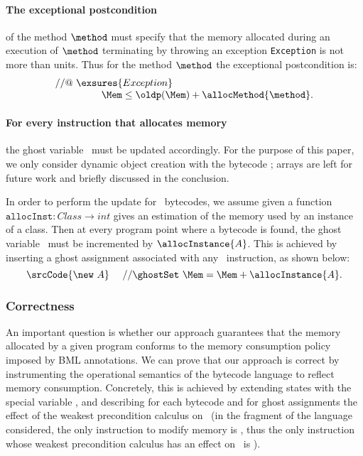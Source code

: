 \paragraph{The exceptional postcondition} of the method $\method$ must
specify that the memory allocated during an execution of $\method$ 
terminating by throwing an exception \texttt{Exception} is not more
than \allocMethod{\method} units. Thus for the method $\method$ the
exceptional postcondition is:
$$
\begin{array}{l}
//@ \ \exsures{Exception} \\
\ \ \ \ \ \ \ \ \ \ \ \ \ \  \Mem \leq \oldp(\Mem) + \allocMethod{\method}.
\end{array}
$$




\paragraph{For every instruction that allocates memory} the ghost
variable \Mem\ must be updated accordingly. For the purpose of
this paper, we only consider dynamic object creation with the 
bytecode \new; arrays are left for future work and briefly discussed 
in the conclusion. 

In order to perform the update for \new\ bytecodes, we assume given a
function $\texttt{allocInst}: Class \rightarrow int$ gives an
estimation of the memory used by an instance of a class. Then at every
program point where a bytecode  is found, the ghost
variable \Mem\ must be incremented by $\allocInstance{A}$. This is
achieved by inserting a ghost assignment associated with any \new\
instruction, as shown below:
$$
\srcCode{\new \ A} \ \ \ \ // \ghostSet \ \Mem = \Mem + \allocInstance{A}.
$$

\subsubsection{Correctness} An important question is whether our approach
guarantees that the memory allocated by a given program conforms to
the memory consumption policy imposed by BML annotations. We can
prove that our approach is correct by instrumenting the operational
semantics of the bytecode language to reflect memory
consumption. Concretely, this is achieved by extending states with the
special variable \Mem, and describing for each bytecode and for ghost
assignments the effect of the weakest precondition calculus on \Mem\
(in the fragment of the language considered, the only instruction to
modify memory is \new, thus the only instruction whose weakest
precondition calculus has an effect on \Mem\ is \new).

